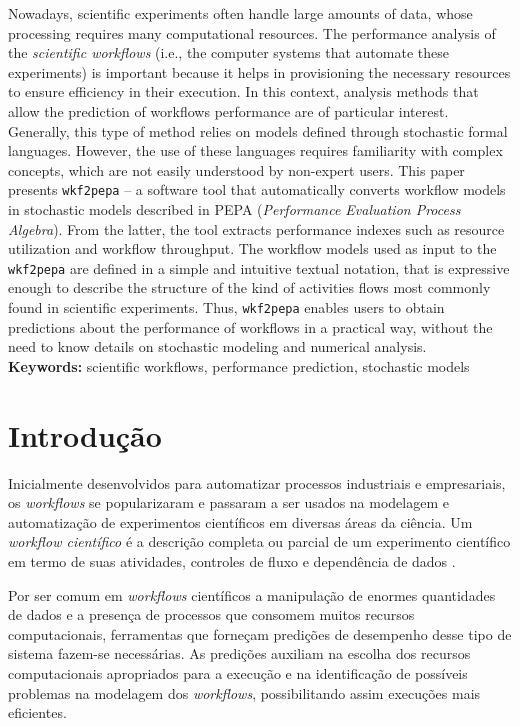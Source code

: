 \documentclass[a4paper,10pt]{article}
\begin{document}
Nowadays, scientific experiments often handle large amounts of data, whose processing requires many computational resources. The performance analysis of the \textit{scientific workflows} (i.e., the computer systems that automate these experiments) is important because it helps in provisioning the necessary resources to ensure efficiency in their execution. In this context, analysis methods that allow the prediction of workflows performance are of particular interest. Generally, this type of method relies on models defined through stochastic formal languages. However, the use of these languages requires familiarity with complex concepts, which are not easily understood by non-expert users. This paper presents \texttt{wkf2pepa} -- a software tool  that automatically converts  workflow models in stochastic models described in PEPA (\textit{Performance Evaluation Process Algebra}). From the latter, the tool extracts performance indexes such as resource utilization and workflow throughput. The workflow models used as input to the \texttt{wkf2pepa} are defined in a simple and intuitive textual notation, that is expressive enough to describe the structure of the kind of activities flows most commonly found in scientific experiments. Thus, \texttt{wkf2pepa} enables users to obtain predictions about the performance of workflows in a practical way, without the need to know details on stochastic modeling and numerical analysis.\\

\noindent \textbf{Keywords:} scientific workflows, performance prediction, stochastic models

    \thispagestyle{fancy}

    \newpage
    \section*{Introdução}
        Inicialmente desenvolvidos para automatizar processos industriais e empresariais, os \emph{workflows} se popularizaram e passaram a ser usados na modelagem e automatização de experimentos científicos em diversas áreas da ciência. Um \emph{workflow científico} é a descrição completa ou parcial de um experimento científico em termo de suas atividades, controles de fluxo e dependência de dados \cite{phd:gadelha12}.

        Por ser comum em \emph{workflows} científicos a manipulação de enormes quantidades de dados e a presença de processos que consomem muitos recursos computacionais, ferramentas que forneçam predições de desempenho desse tipo de sistema fazem-se necessárias. As predições auxiliam na escolha dos recursos computacionais apropriados para a execução e na identificação de possíveis problemas na modelagem dos \emph{workflows}, possibilitando assim execuções mais eficientes.
\end{document}
